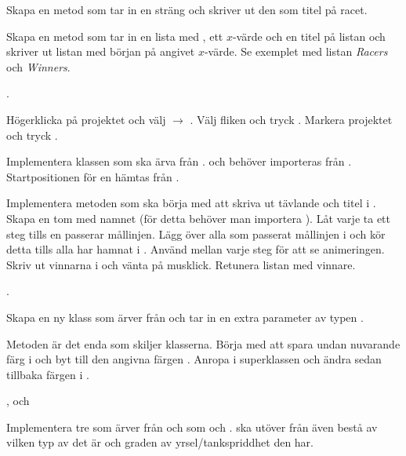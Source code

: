 \Subtask Skapa en metod  som tar in en sträng och skriver ut den som titel på racet.

\Subtask Skapa en metod  som tar in en lista med , ett $x$-värde och en titel på listan och skriver ut listan med början på angivet $x$-värde. Se exemplet med listan \textit{Racers} och \textit{Winners}.

\Task {}.

\Subtask Högerklicka på projektet  och välj  $\rightarrow$ . Välj fliken  och tryck . Markera projektet  och tryck .

\Subtask Implementera klassen  som ska ärva från .  och  behöver importeras från . Startpositionen för en  hämtas från .

\Task {}

\Subtask Implementera metoden  som ska börja med att skriva ut tävlande och titel i . Skapa en tom  med namnet  (för detta behöver man importera ). Låt varje  ta ett steg tills en passerar mållinjen. Lägg över alla som passerat mållinjen i  och kör detta tills alla  har hamnat i . Använd  mellan varje steg för att se animeringen. Skriv ut vinnarna i  och vänta på musklick. Retunera listan med vinnare.

\Task {}.

\Subtask Skapa en ny klass  som ärver från  och tar in en extra parameter  av typen .

\Subtask Metoden  är det enda som skiljer klasserna. Börja med att spara undan nuvarande färg i  och byt till den angivna färgen . Anropa  i superklassen och ändra sedan tillbaka färgen i .

\Task {},  och 

\Subtask Implementera tre  som ärver från  och som   och .  ska utöver  från  även bestå av vilken typ av  det är och graden av yrsel/tankspriddhet den har.


